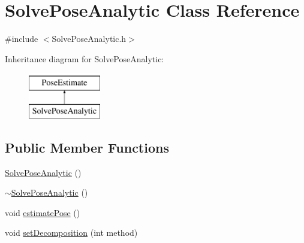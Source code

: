 \hypertarget{classSolvePoseAnalytic}{\section{\-Solve\-Pose\-Analytic \-Class \-Reference}
\label{classSolvePoseAnalytic}
}


{\ttfamily \#include $<$\-Solve\-Pose\-Analytic.\-h$>$}

\-Inheritance diagram for \-Solve\-Pose\-Analytic\-:\begin{figure}[H]
\begin{center}
\leavevmode
\includegraphics[height=2.000000cm]{classSolvePoseAnalytic}
\end{center}
\end{figure}
\subsection*{\-Public \-Member \-Functions}
\begin{DoxyCompactItemize}
\item 
\hyperlink{classSolvePoseAnalytic_a46909a99ed0f06e70aa4b9d999c6356b}{\-Solve\-Pose\-Analytic} ()
\item 
\hyperlink{classSolvePoseAnalytic_a0bce3ad52a52f23cd14eabd7de12d832}{$\sim$\-Solve\-Pose\-Analytic} ()
\item 
void \hyperlink{classSolvePoseAnalytic_a0a3fd0af007d4a945c03f49f820badcf}{estimate\-Pose} ()
\item 
void \hyperlink{classSolvePoseAnalytic_aff3d9a1a6c15b4076d8fc560fd18176c}{set\-Decomposition} (int method)
\end{DoxyCompactItemize}
